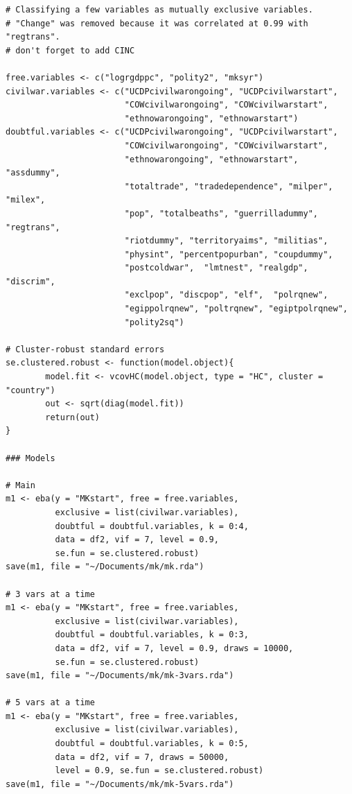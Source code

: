 \documentclass[a4paper,12pt]{article}
\begin{document}
\scriptsize

\begin{verbatim}
# Classifying a few variables as mutually exclusive variables.
# "Change" was removed because it was correlated at 0.99 with "regtrans". 
# don't forget to add CINC

free.variables <- c("logrgdppc", "polity2", "mksyr")
civilwar.variables <- c("UCDPcivilwarongoing", "UCDPcivilwarstart",
                        "COWcivilwarongoing", "COWcivilwarstart",
                        "ethnowarongoing", "ethnowarstart")
doubtful.variables <- c("UCDPcivilwarongoing", "UCDPcivilwarstart",
                        "COWcivilwarongoing", "COWcivilwarstart",
                        "ethnowarongoing", "ethnowarstart", "assdummy",
                        "totaltrade", "tradedependence", "milper", "milex",
                        "pop", "totalbeaths", "guerrilladummy", "regtrans",
                        "riotdummy", "territoryaims", "militias",
                        "physint", "percentpopurban", "coupdummy",
                        "postcoldwar",  "lmtnest", "realgdp", "discrim",
                        "exclpop", "discpop", "elf",  "polrqnew",
                        "egippolrqnew", "poltrqnew", "egiptpolrqnew",
                        "polity2sq")

# Cluster-robust standard errors
se.clustered.robust <- function(model.object){
        model.fit <- vcovHC(model.object, type = "HC", cluster = "country")
        out <- sqrt(diag(model.fit))
        return(out)
}

### Models

# Main
m1 <- eba(y = "MKstart", free = free.variables,
          exclusive = list(civilwar.variables),
          doubtful = doubtful.variables, k = 0:4,
          data = df2, vif = 7, level = 0.9,
          se.fun = se.clustered.robust)
save(m1, file = "~/Documents/mk/mk.rda")

# 3 vars at a time
m1 <- eba(y = "MKstart", free = free.variables,
          exclusive = list(civilwar.variables),
          doubtful = doubtful.variables, k = 0:3,
          data = df2, vif = 7, level = 0.9, draws = 10000,
          se.fun = se.clustered.robust)
save(m1, file = "~/Documents/mk/mk-3vars.rda")

# 5 vars at a time
m1 <- eba(y = "MKstart", free = free.variables,
          exclusive = list(civilwar.variables),
          doubtful = doubtful.variables, k = 0:5,
          data = df2, vif = 7, draws = 50000,
          level = 0.9, se.fun = se.clustered.robust)
save(m1, file = "~/Documents/mk/mk-5vars.rda")


\end{verbatim}
\end{document}
